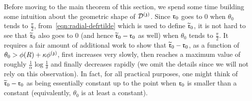 
\medskip
Before moving to the main theorem of this section, we spend some time building some intuition about the geometric shape of $\dt$. 
Since $\rabs_0$ goes to $0$ when $\theta_0$ tends to $\frac{\pi}{2}$, from~\eqref{eqn:radial-defrtilde} which is used to define $\widetilde{\rabs}_0$, it is not hard to see that 
$\widetilde{\rabs}_0$ also goes to $0$
(and hence $\widetilde{\rabs}_0-\rabs_0$ as well) when $\theta_0$ tends to $\frac{\pi}{2}$.
It requires a fair amount of additional work to show that $\widetilde{\rabs}_0-\rabs_0$, as a function of $\theta_0>\phi(R)+\kappa\phi^{(\ss)}$, first increases very slowly, then reaches a maximum value of roughly $\frac{1}{\alpha}\log\frac{1}{\delta}$
and finally decreases rapidly (we omit the details since we will not rely on this observation). In fact, for all practical purposes, one might think of $\widetilde{\rabs}_0-\rabs_0$ as being essentially constant up to the point when $\rabs_0$ is smaller than a constant (equivalently, $\theta_0$ is at least a constant).

